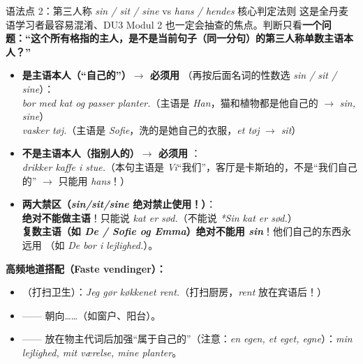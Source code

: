 \begin{grammatikbox}{语法点 2：第三人称 \textit{sin / sit / sine} vs \textit{hans / hendes} 核心判定法则}
这是全丹麦语学习者最容易混淆、DU3 Modul 2 也一定会抽查的焦点。判断只看\textbf{一个问题：“这个所有格指的主人，是不是当前句子（同一分句）的第三人称单数主语本人？”}

\begin{itemize}
  \item \textbf{是主语本人（“自己的”）$\rightarrow$ 必须用 }（再按后面名词的性数选 \textit{sin / sit / sine}）：\\
    \textit{ bor med  kat og passer  planter.}（主语是 \textit{Han}，猫和植物都是他自己的 $\rightarrow$ \textit{sin, sine}）\\
    \textit{ vasker  tøj.}（主语是 \textit{Sofie}，洗的是她自己的衣服，\textit{et tøj} $\rightarrow$ \textit{sit}）
  \item \textbf{不是主语本人（指别人的）$\rightarrow$ 必须用 }：\\
    \textit{ drikker kaffe i  stue.}（本句主语是 \textit{Vi}“我们”，客厅是卡斯珀的，不是“我们自己的” $\rightarrow$ 只能用 \textit{hans}！）
  \item \textbf{两大禁区（\textit{sin/sit/sine} 绝对禁止使用！）}：\\
     \textbf{绝对不能做主语}！只能说 \textit{ kat er sød.}（不能说 \textit{*Sin kat er sød.}）\\
     \textbf{复数主语（如 \textit{De / Sofie og Emma}）绝对不能用 \textit{sin}}！他们自己的东西永远用 （如 \textit{De bor i  lejlighed.}）。
\end{itemize}

\textbf{高频地道搭配（Faste vendinger）：}
\begin{itemize}
  \item {}（打扫卫生）：\textit{Jeg gør køkkenet rent.}（打扫厨房，\textit{rent} 放在宾语后！）
  \item {} —— 朝向……（如窗户、阳台）。
  \item {} —— 放在物主代词后加强“属于自己的”（注意：\textit{en egen, et eget, egne}）：\textit{min  lejlighed, mit  værelse, mine  planter}。
\end{itemize}
\end{grammatikbox}


